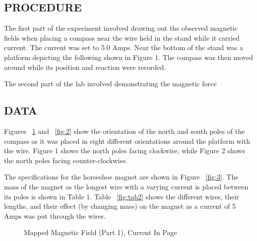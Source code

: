 \documentclass [12pt, letterpaper, twoside] {article}
\begin{document}
\subsection* {PROCEDURE}
The first part of the experiment involved drawing out the observed magnetic fields when placing a compass near the wire held in the stand while it carried current. The current was set to 5.0 Amps. Near the bottom of the stand was a platform depicting the following shown in Figure 1. The compass was then moved around while its position and reaction were recorded.

The second part of the lab involved demonstrating the magnetic force 

\subsection* {DATA}
Figures ~\ref{fig:1} and ~\ref{fig:2} show the orientation of the north and south poles of the compass as it was placed in eight different orientations around the platform with the wire. Figure 1 shows the north poles facing clockwise, while Figure 2 shows the north poles facing counter-clockwise.

\noindent
The specifications for the horseshoe magnet are shown in Figure ~\ref{fig:3}. The mass of the magnet as the longest wire with a varying current is placed between its poles is shown in Table 1. Table ~\ref{fig:tab2} shows the different wires, their lengths, and their effect (by changing mass) on the magnet as a current of 5 Amps was put through the wires.

\begin{figure}
  \centering
  \caption{Mapped Magnetic Field (Part 1), Current In Page}
  \label{fig:1}
\end{figure}
\end{document}
